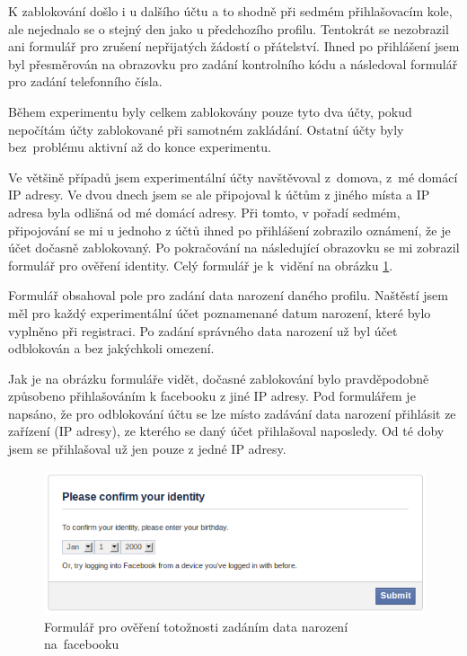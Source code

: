 \documentclass[thesis=M,czech]{FITthesis}[2013/05/10]
\begin{document}
K zablokování došlo i u dalšího účtu a to shodně při sedmém přihlašovacím kole, ale nejednalo se o stejný den jako u předchozího profilu. Tentokrát se nezobrazil ani formulář pro zrušení nepřijatých žádostí o přátelství. Ihned po přihlášení jsem byl přesměrován na obrazovku pro zadání kontrolního kódu a následoval formulář pro zadání telefonního čísla.

Během experimentu byly celkem zablokovány pouze tyto dva účty, pokud nepočítám účty zablokované při samotném zakládání. Ostatní účty byly bez~problému aktivní až do konce experimentu.

Ve většině případů jsem experimentální účty navštěvoval z~domova, z~mé domácí IP adresy. Ve dvou dnech jsem se ale připojoval k účtům z jiného místa a IP adresa byla odlišná od mé domácí adresy. Při tomto, v pořadí sedmém, připojování se mi u jednoho z účtů ihned po přihlášení zobrazilo oznámení, že je účet dočasně zablokovaný. Po pokračování na následující obrazovku se mi zobrazil formulář pro ověření identity. Celý formulář je k~vidění na obrázku \ref{fig:confirmIdentity}.

Formulář obsahoval pole pro zadání data narození daného profilu. Naštěstí jsem měl pro každý experimentální účet poznamenané datum narození, které bylo vyplněno při registraci. Po zadání správného data narození už byl účet odblokován a bez jakýchkoli omezení. 

Jak je na obrázku formuláře vidět, dočasné zablokování bylo pravděpodobně způsobeno přihlašováním k facebooku z jiné IP adresy. Pod formulářem je napsáno, že pro odblokování účtu se lze místo zadávání data narození přihlásit ze zařízení (IP adresy), ze kterého se daný účet přihlašoval naposledy. Od té doby jsem se přihlašoval už jen pouze z jedné IP adresy.

\begin{figure}[h]
\begin{center}
\includegraphics[width=5in]{figures/confirmIdentity.png}
\caption{Formulář pro ověření totožnosti zadáním data narození na~facebooku}
\label{fig:confirmIdentity}
\end{center}
\end{figure}
\end{document}
